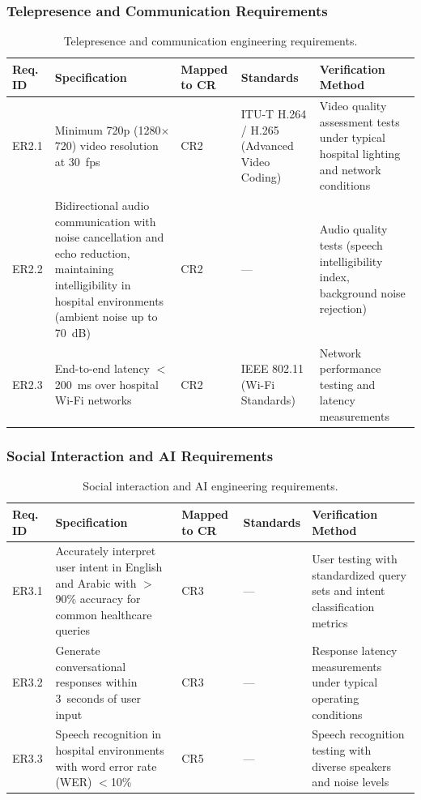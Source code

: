 \subsubsection{Telepresence and Communication Requirements}

\begin{table}[H]
\centering
\small
\begin{tabularx}{\linewidth}{|l|>{\raggedright\arraybackslash}X|l|>{\raggedright\arraybackslash}X|>{\raggedright\arraybackslash}X|}
\hline
\textbf{Req. ID} & \textbf{Specification} & \textbf{Mapped to CR} & \textbf{Standards} & \textbf{Verification Method} \\
\hline
ER2.1 & Minimum 720p (1280$\times$720) video resolution at 30~fps & CR2 & ITU-T H.264 / H.265 \cite{itut_h264_h265} (Advanced Video Coding) & Video quality assessment tests under typical hospital lighting and network conditions \\
\hline
ER2.2 & Bidirectional audio communication with noise cancellation and echo reduction, maintaining intelligibility in hospital environments (ambient noise up to 70~dB) & CR2 & --- & Audio quality tests (speech intelligibility index, background noise rejection) \\
\hline
ER2.3 & End-to-end latency $<$200~ms over hospital Wi-Fi networks & CR2 & IEEE 802.11 \cite{ieee802.11} (Wi-Fi Standards) & Network performance testing and latency measurements \\
\hline
\end{tabularx}
\caption{Telepresence and communication engineering requirements.}
\label{tab:er_telepresence}
\end{table}

\subsubsection{Social Interaction and AI Requirements}

\begin{table}[H]
\centering
\small
\begin{tabularx}{\linewidth}{|l|>{\raggedright\arraybackslash}X|l|>{\raggedright\arraybackslash}X|>{\raggedright\arraybackslash}X|}
\hline
\textbf{Req. ID} & \textbf{Specification} & \textbf{Mapped to CR} & \textbf{Standards} & \textbf{Verification Method} \\
\hline
ER3.1 & Accurately interpret user intent in English and Arabic with $>$90\% accuracy for common healthcare queries & CR3 & --- & User testing with standardized query sets and intent classification metrics \\
\hline
ER3.2 & Generate conversational responses within 3~seconds of user input & CR3 & --- & Response latency measurements under typical operating conditions \\
\hline
ER3.3 & Speech recognition in hospital environments with word error rate (WER) $<$10\% & CR5 & --- & Speech recognition testing with diverse speakers and noise levels \\
\hline
\end{tabularx}
\caption{Social interaction and AI engineering requirements.}
\label{tab:er_ai}
\end{table}

